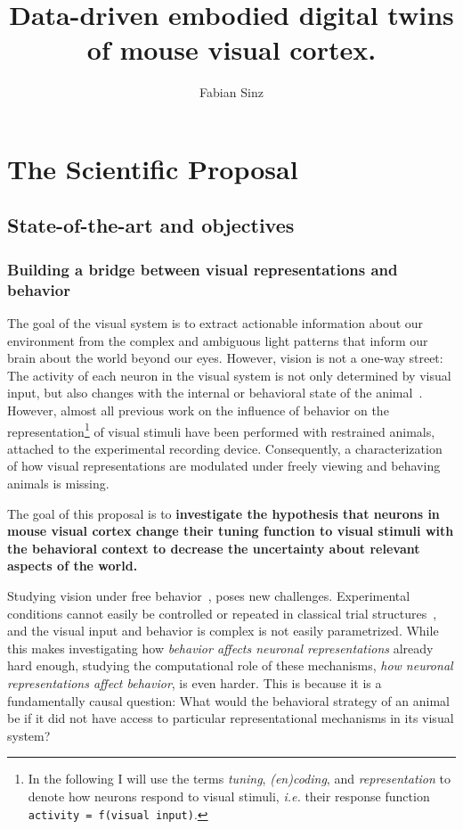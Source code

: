 \documentclass[B2,COG]{ercgrant}
\author{Fabian Sinz}
\title{Data-driven embodied digital twins of mouse visual cortex.}
\begin{document}
\maketitle



\chapter{The Scientific Proposal}


\section{State-of-the-art and objectives}\label{sec:stateofart}
\subsection{Building a bridge between visual representations and behavior}
The goal of the visual system is to extract actionable information about our environment from the complex and ambiguous light patterns that inform our brain about the world beyond our eyes.
However, vision is not a one-way street: The activity of each neuron in the visual system is not only determined by visual input, but also changes with the internal or behavioral state of the animal~\parencite{Niell2010-bs, Musall2019-kd, Erisken2014-un, Franke2022-do}. 
However, almost all previous work on the influence of behavior on the representation\footnote{In the following I will use the terms \textit{tuning}, \textit{(en)coding}, and \textit{representation} to denote how neurons respond to visual stimuli, \textit{i.e.} their response function \texttt{activity = f(visual input)}.} of visual stimuli have been performed with restrained animals, attached to the experimental recording device.
Consequently, a characterization of how visual representations are modulated under freely viewing and behaving animals is missing. 

The goal of this proposal is to \textbf{investigate the hypothesis that neurons in mouse visual cortex change their tuning function to visual stimuli with the behavioral context to decrease the uncertainty about relevant aspects of the world.} 

Studying vision under free behavior~\parencite{Parker2022-ac}, poses new challenges. 
Experimental conditions cannot easily be controlled or repeated in classical trial structures~\parencite{Huk2018-ez}, and the visual input and behavior is complex is not easily parametrized. 
While this makes investigating how \textit{behavior affects neuronal representations} already hard enough, studying the computational role of these mechanisms, \textit{how neuronal representations affect behavior}, is even harder.
This is because it is a fundamentally causal question: What would the behavioral strategy of an animal be if it did not have access to particular representational mechanisms in its visual system?
\end{document}
